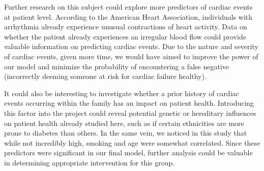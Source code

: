 \documentclass[12pt]{article}
\begin{document}
Further research on this subject could explore more predictors of cardiac events at patient level. According to the American Heart Association, individuals with arrhythmia already experience unusual contractions of heart activity. Data on whether the patient already experiences an irregular blood flow could provide valuable information on predicting cardiac events. Due to the nature and severity of cardiac events, given more time, we would have aimed to improve the power of our model and minimize the probability of encountering a false negative (incorrectly deeming someone at risk for cardiac failure healthy).


It could also be interesting to investigate whether a prior history of cardiac events occurring within the family has an impact on patient health. Introducing this factor into the project could reveal potential genetic or hereditary influences on patient health already studied here, such as if certain ethnicities are more prone to diabetes than others. In the same vein, we noticed in this study that while not incredibly high, smoking and age were somewhat correlated. Since these predictors were significant in our final model, further analysis could be valuable in determining appropriate intervention for this group. 


\end{document}
